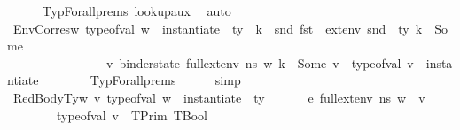 \begin{isabellebody}
\ \ \ \ \isamarkupfalse%
\ TypForall{\isachardot}{\kern0pt}prems\ lookup{\isacharunderscore}{\kern0pt}aux\ \isamarkupfalse%
\ auto\isanewline
\isanewline
\isanewline
\ \ \isamarkupfalse%
\ EnvCorres{\isacharcolon}{\kern0pt}{\isachardoublequoteopen}{\isasymAnd}w{\isachardot}{\kern0pt}\ type{\isacharunderscore}{\kern0pt}of{\isacharunderscore}{\kern0pt}val\ w\ {\isacharequal}{\kern0pt}\ instantiate\ {\isasymOmega}\ ty\ {\isasymLongrightarrow}\ {\isasymforall}k\ {\isasymtau}{\isacharprime}{\kern0pt}{\isachardot}{\kern0pt}\ {\isacharparenleft}{\kern0pt}snd\ {\isacharparenleft}{\kern0pt}fst\ {\isasymDelta}{\isacharcomma}{\kern0pt}\ ext{\isacharunderscore}{\kern0pt}env\ {\isacharparenleft}{\kern0pt}snd\ {\isasymDelta}{\isacharparenright}{\kern0pt}\ ty{\isacharparenright}{\kern0pt}{\isacharparenright}{\kern0pt}\ k\ {\isacharequal}{\kern0pt}\ Some\ {\isasymtau}{\isacharprime}{\kern0pt}\ {\isasymlongrightarrow}\ \isanewline
\ \ \ \ \ \ \ \ \ \ \ \ \ \ \ \ {\isacharparenleft}{\kern0pt}{\isasymexists}v{\isachardot}{\kern0pt}\ binder{\isacharunderscore}{\kern0pt}state\ {\isacharparenleft}{\kern0pt}full{\isacharunderscore}{\kern0pt}ext{\isacharunderscore}{\kern0pt}env\ n{\isacharunderscore}{\kern0pt}s\ w{\isacharparenright}{\kern0pt}\ k\ {\isacharequal}{\kern0pt}\ Some\ v\ {\isasymand}\ type{\isacharunderscore}{\kern0pt}of{\isacharunderscore}{\kern0pt}val\ v\ {\isacharequal}{\kern0pt}\ instantiate\ {\isasymOmega}\ {\isasymtau}{\isacharprime}{\kern0pt}{\isacharparenright}{\kern0pt}{\isachardoublequoteclose}\isanewline
\ \ \ \ \isamarkupfalse%
\ TypForall{\isachardot}{\kern0pt}prems{\isacharparenleft}{\kern0pt}{}{\isacharparenright}{\kern0pt}\isanewline
\ \ \ \ \isamarkupfalse%
\ simp\isanewline
\ \ \isamarkupfalse%
\ RedBodyTy{\isacharcolon}{\kern0pt}{\isachardoublequoteopen}{\isasymAnd}w\ v{\isacharprime}{\kern0pt}{\isachardot}{\kern0pt}\ type{\isacharunderscore}{\kern0pt}of{\isacharunderscore}{\kern0pt}val\ w\ {\isacharequal}{\kern0pt}\ instantiate\ {\isasymOmega}\ ty\ {\isasymLongrightarrow}\ \ {\isasymLambda}{\isacharcomma}{\kern0pt}\ {\isasymGamma}{\isacharcomma}{\kern0pt}\ {\isasymOmega}\ {\isasymturnstile}\ {\isasymlangle}e{\isacharcomma}{\kern0pt}\ full{\isacharunderscore}{\kern0pt}ext{\isacharunderscore}{\kern0pt}env\ n{\isacharunderscore}{\kern0pt}s\ w{\isasymrangle}\ {\isasymDown}\ v{\isacharprime}{\kern0pt}\ {\isasymLongrightarrow}\isanewline
\ \ \ \ \ \ \ \ type{\isacharunderscore}{\kern0pt}of{\isacharunderscore}{\kern0pt}val\ v{\isacharprime}{\kern0pt}\ {\isacharequal}{\kern0pt}\ TPrim\ TBool{\isachardoublequoteclose}\isanewline

\end{isabellebody}

